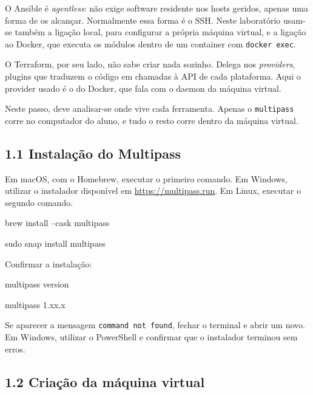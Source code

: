 \documentclass[11pt,a4paper]{article}
\newcommand{\cmd}[1]{\texttt{#1}}
\begin{document}
\begin{teoria}
O Ansible é \emph{agentless}: não exige software residente nos hosts geridos, apenas uma forma de os alcançar. Normalmente essa forma é o SSH. Neste laboratório usam-se também a ligação local, para configurar a própria máquina virtual, e a ligação ao Docker, que executa os módulos dentro de um container com \cmd{docker exec}.

O Terraform, por seu lado, não sabe criar nada sozinho. Delega nos \emph{providers}, plugins que traduzem o código em chamadas à API de cada plataforma. Aqui o provider usado é o do Docker, que fala com o daemon da máquina virtual.

Neste passo, deve analisar-se onde vive cada ferramenta. Apenas o \cmd{multipass} corre no computador do aluno, e tudo o resto corre dentro da máquina virtual.
\end{teoria}

\subsection*{1.1 Instalação do Multipass}

Em macOS, com o Homebrew, executar o primeiro comando. Em Windows, utilizar o instalador disponível em \url{https://multipass.run}. Em Linux, executar o segundo comando.

\begin{terminal}
brew install --cask multipass
\end{terminal}

\begin{terminal}
sudo snap install multipass
\end{terminal}

Confirmar a instalação:

\begin{terminal}
multipass version
\end{terminal}

\begin{saida}
multipass   1.xx.x
\end{saida}

\begin{erro}
Se aparecer a mensagem \cmd{command not found}, fechar o terminal e abrir um novo. Em Windows, utilizar o PowerShell e confirmar que o instalador terminou sem erros.
\end{erro}

\subsection*{1.2 Criação da máquina virtual}
\end{document}
